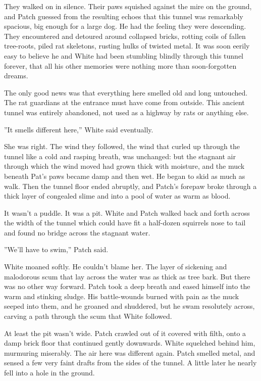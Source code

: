 \documentclass[12pt]{book}
\begin{document}
 They walked on in silence. Their paws squished against the mire on the ground, and Patch guessed from the resulting echoes that this tunnel was remarkably spacious, big enough for a large dog. He had the feeling they were descending. They encountered and detoured around collapsed bricks, rotting coils of fallen tree-roots, piled rat skeletons, rusting hulks of twisted metal. It was soon eerily easy to believe he and White had been stumbling blindly through this tunnel forever, that all his other memories were nothing more than soon-forgotten dreams.\par
 The only good news was that everything here smelled old and long untouched. The rat guardians at the entrance must have come from outside. This ancient tunnel was entirely abandoned, not used as a highway by rats or anything else.\par
 ''It smells different here,'' White said eventually.\par
 She was right. The wind they followed, the wind that curled up through the tunnel like a cold and rasping breath, was unchanged: but the stagnant air through which the wind moved had grown thick with moisture, and the muck beneath Pat's paws became damp and then wet. He began to skid as much as walk. Then the tunnel floor ended abruptly, and Patch's forepaw broke through a thick layer of congealed slime and into a pool of water as warm as blood.\par
 It wasn't a puddle. It was a pit. White and Patch walked back and forth across the width of the tunnel %
 which could have fit a half-dozen squirrels nose to tail %
 and found no bridge across the stagnant water.\par
 ''We'll have to swim,'' Patch said.\par
 White moaned softly. He couldn't blame her. The layer of sickening and malodorous scum that lay across the water was as thick as tree bark. But there was no other way forward. Patch took a deep breath and eased himself into the warm and stinking sludge. His battle-wounds burned with pain as the muck seeped into them, and he groaned and shuddered, but he swam resolutely across, carving a path through the scum that White followed.\par
 At least the pit wasn't wide. Patch crawled out of it covered with filth, onto a damp brick floor that continued gently downwards. White squelched behind him, murmuring miserably. The air here was different again. Patch smelled metal, and sensed a few very faint drafts from the sides of the tunnel. A little later he nearly fell into a hole in the ground.\par
\end{document}
